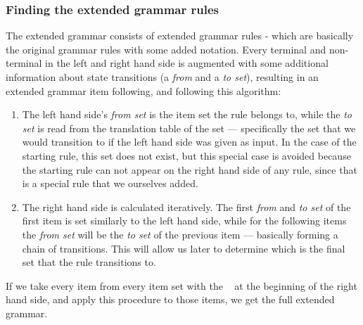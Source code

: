 \subsubsection{Finding the extended grammar rules} 
The extended grammar consists of extended grammar rules - which are basically the original grammar rules with some added notation. Every terminal and non-terminal in the left and right hand side is augmented with some additional information about state transitions (a \textit{from} and a \textit{to set}), resulting in an extended grammar item following, and following this algorithm:
\begin{enumerate}
\item The left hand side's \textit{from set} is the item set the rule belongs to, while the \textit{to set} is read from the translation table of the set --- specifically the set that we would transition to if the left hand side was given as input. In the case of the starting rule, this set does not exist, but this special case is avoided because the starting rule can not appear on the right hand side of any rule, since that is a special rule that we ourselves added.
\item The right hand side is calculated iteratively. The first \textit{from} and \textit{to set} of the first item is set similarly to the left hand side, while for the following items the \textit{from set} will be the \textit{to set} of the previous item --- basically forming a chain of transitions. This will allow us later to determine which is the final set that the rule transitions to.
\end{enumerate}
If we take every item from every item set with the \textbullet ~ at the beginning of the right hand side, and apply this procedure to those items, we get the full extended grammar.
